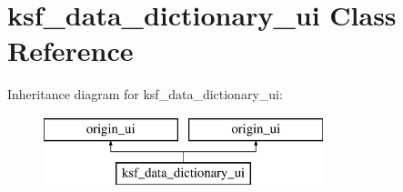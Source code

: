 \hypertarget{classksf__data__dictionary__ui}{}\section{ksf\+\_\+data\+\_\+dictionary\+\_\+ui Class Reference}
\label{classksf__data__dictionary__ui}
Inheritance diagram for ksf\+\_\+data\+\_\+dictionary\+\_\+ui\+:\begin{figure}[H]
\begin{center}
\leavevmode
\includegraphics[height=2.000000cm]{d0/d52/classksf__data__dictionary__ui}
\end{center}
\end{figure}
